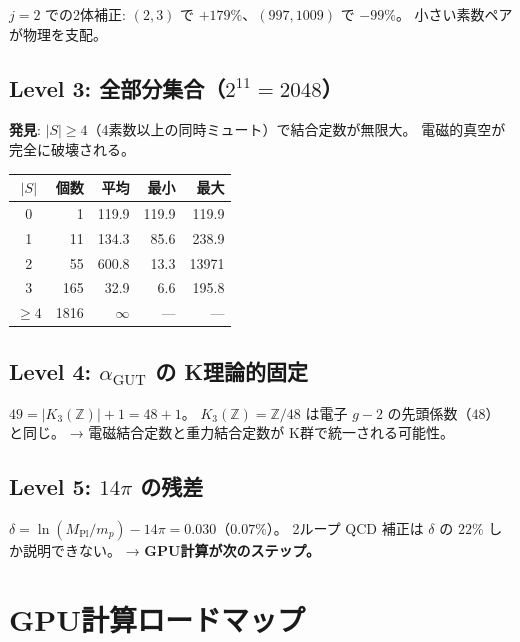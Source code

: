 \documentclass[11pt,a4paper]{article}
\begin{document}
$j=2$ での2体補正: $(2,3)$ で $+179\%$、$(997,1009)$ で $-99\%$。
小さい素数ペアが物理を支配。

\subsection{Level 3: 全部分集合（$2^{11} = 2048$）}

\textbf{発見}: $|S| \geq 4$（4素数以上の同時ミュート）で結合定数が無限大。
電磁的真空が完全に破壊される。

\begin{center}
\begin{tabular}{crrrr}
\toprule
$|S|$ & 個数 & 平均 & 最小 & 最大 \\
\midrule
0 & 1 & 119.9 & 119.9 & 119.9 \\
1 & 11 & 134.3 & 85.6 & 238.9 \\
2 & 55 & 600.8 & 13.3 & 13971 \\
3 & 165 & 32.9 & 6.6 & 195.8 \\
$\geq 4$ & 1816 & $\infty$ & --- & --- \\
\bottomrule
\end{tabular}
\end{center}

\subsection{Level 4: $\alpha_{\mathrm{GUT}}$ の K理論的固定}

$49 = |K_3(\mathbb{Z})| + 1 = 48 + 1$。
$K_3(\mathbb{Z}) = \mathbb{Z}/48$ は電子 $g-2$ の先頭係数（$48$）と同じ。
→ 電磁結合定数と重力結合定数が K群で統一される可能性。

\subsection{Level 5: $14\pi$ の残差}

$\delta = \ln(M_{\mathrm{Pl}}/m_p) - 14\pi = 0.030$（$0.07\%$）。
2ループ QCD 補正は $\delta$ の $22\%$ しか説明できない。
→ \textbf{GPU計算が次のステップ。}

\section{GPU計算ロードマップ}
\end{document}
